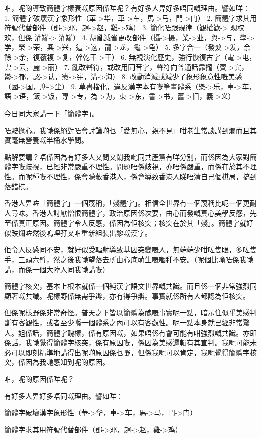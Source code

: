 咁，呢啲導致簡體字樣衰嘅原因係咩呢？有好多人畀好多唔同嘅理由。譬如咩：
1. 簡體字破壞漢字象形性（華->华，車->车，馬->马，門->门）
2. 簡體字求其用符號代替部件（鄧->邓，趙->赵，雞->鸡）
3. 簡化唔跟規律（觀權歡-> 观权欢，但係 灌罐-> 灌罐）
4. 胡亂減省更改部件（攝->摄，業->业，與->与，學->学，榮->荣，興->兴，這->这，龍->龙，龜->龟）
5. 多字合一（發髮->发，余餘->余，復覆複->复，幹乾干->干）
6. 無視演化歷史，強行恢復古字（電->电，雲->云，麗->丽）
7. 亂改聲符，或改用同音字，聲符向普通話靠攏（賓->宾，鬱->郁，認->认，憲->宪，溝->沟）
8. 改動消滅或減少了象形象意性嘅美感（國->国，塵->尘）
9. 草書楷化，違反漢字本有嘅筆畫體系（樂->乐，車->车，語->语，飯->饭，專->专，為->为，東->东，書->书，舊->旧，義->义）


今日同大家講一下「簡體字」。

唔駛擔心。我哋係絕對唔會討論啲乜「愛無心，親不見」咁老生常談講到爛而且其實毫無營養嘅半桶水學問。

點解要講？唔係因為有好多人又問又鬧我哋同共產黨有咩分別，而係因為大家對簡體字嘅歧視，已經非常嚴重不理性。問題唔係歧視，亦唔係嚴重，而係在於其不理性。而呢種嘅不理性，係會矇蔽香港人，係會導致香港人睇唔清自己個棋局，搞到落錯棋。

香港人畀咗「簡體字」一個蔑稱，「殘體字」。相信全世界冇一個蔑稱比呢一個更耐人尋味。香港人討厭憎恨簡體字，政治原因係次要，由心而發嘅真心美學反感，先至係真正原因。簡體字令人反感，係因為佢核突；核突在於其「殘」。簡體字就好似跌爛咗然後嗚哩孖叉咁重新組裝出黎嘅漢字。

佢令人反感同不安，就好似受輻射導致基因突變嘅人，無端端少咁咗隻眼，多咗隻手，三頭六臂，然之後我哋望落去所由心底萌生嘅嗰種不安。（呢個比喻唔係我哋講，而係一個大陸人同我哋講嘅）

簡體字核突，基本上根本就係一個純漢字語文世界嘅共識。而且係一個非常強烈同顯著嘅共識。呢樣野係無需爭辯，亦冇得爭辯。事實就係所有人都認為佢核突。

但係呢樣野係非常奇怪。普天之下皆以簡體為醜嘅事實呢一點，暗示住似乎美感判斷有客觀性，或者至少喺一個體系之內可以有客觀性。呢一點本身就已經非常驚人。姐係話，簡體字醜樣，係有原因嘅，如果唔係冇會可能有咁強烈嘅共識。亦即係話，我哋覺得簡體字核突，係有原因嘅，係因為美感邏輯有其宣判。我哋可能未必可以即刻精準地講得出呢啲原因係乜嘢，但係我哋可以肯定，我哋覺得簡體字核突，係因為我哋感知到呢啲原因。

咁，呢啲原因係咩呢？

有好多人畀好多唔同嘅理由。譬如咩：

簡體字破壞漢字象形性（華->华，車->车，馬->马，門->门）

簡體字求其用符號代替部件（鄧->邓，趙->赵，雞->鸡）

